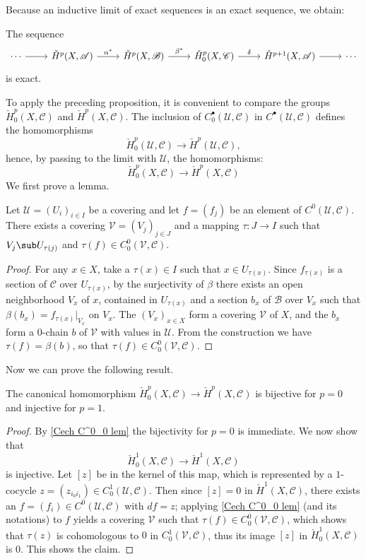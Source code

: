Because an inductive limit of exact sequences is an exact sequence, we obtain:
\begin{proposition}
The sequence
\[\begin{tikzcd}
\cdots\ar[r]&\check{H}^p(X,\mathscr{A})\ar[r,"\alpha^*"]&\check{H}^p(X,\mathscr{B})\ar[r,"\beta^*"]&\check{H}^p_0(X,\mathscr{C})\ar[r,"\delta"]&\check{H}^{p+1}(X,\mathscr{A})\ar[r]&\cdots
\end{tikzcd}\]
is exact.
\end{proposition}
To apply the preceding proposition, it is convenient to compare the groups
$\check{H}^p_0(X,\mathscr{C})$ and $\check{H}^p(X,\mathscr{C})$. The inclusion of $C_0^\bullet(\mathcal{U},\mathscr{C})$ in $C^\bullet(\mathcal{U},\mathscr{C})$ defines the homomorphisms
\[\check{H}_0^p(\mathcal{U},\mathscr{C})\to\check{H}^p(\mathcal{U},\mathscr{C}),\]
hence, by passing to the limit with $\mathcal{U}$, the homomorphisms:
\[\check{H}_0^p(X,\mathscr{C})\to\check{H}^p(X,\mathscr{C})\]
We first prove a lemma.
\begin{lemma}\label{Cech C^0_0 lem}
Let $\mathcal{U}=(U_i)_{i\in I}$ be a covering and let $f=(f_j)$ be an element of $C^0(\mathcal{U},\mathscr{C})$. There exists a covering $\mathcal{V}=(V_j)_{j\in J}$ and a mapping $\tau:J\to I$ such that $V_j\sub U_{\tau(j)}$ and $\tau(f)\in C^0_0(\mathcal{V},\mathscr{C})$.
\end{lemma}
\begin{proof}
For any $x\in X$, take a $\tau(x)\in I$ such that $x\in U_{\tau(x)}$. Since $f_{\tau(x)}$ is a section of $\mathscr{C}$ over $U_{\tau(x)}$, by the surjectivity of $\beta$ there exists an open neighborhood $V_x$ of $x$, contained in $U_{\tau(x)}$ and a section $b_x$ of $\mathscr{B}$ over $V_x$ such that $\beta(b_x)=f_{\tau(x)}|_{V_x}$ on $V_x$. The $(V_x)_{x\in X}$ form a covering $\mathcal{V}$ of $X$, and the $b_x$ form a $0$-chain $b$ of $\mathcal{V}$ with values in $\mathcal{U}$. From the construction we have $\tau(f)=\beta(b)$, so that $\tau(f)\in C^0_0(\mathcal{V},\mathscr{C})$.
\end{proof}
Now we can prove the following result.
\begin{theorem}\label{Cech cohomology equal to cohomology at 0 1} 
The canonical homomorphism $\check{H}^p_0(X,\mathscr{C})\to\check{H}^p(X,\mathscr{C})$ is bijective for $p=0$ and injective for $p=1$.
\end{theorem}
\begin{proof}
By \cref{Cech C^0_0 lem} the bijectivity for $p=0$ is immediate. We now show that
\[\check{H}^1_0(X,\mathscr{C})\to\check{H}^1(X,\mathscr{C})\]
is injective. Let $[z]$ be in the kernel of this map, which is represented by a $1$-cocycle $z=(z_{i_0i_1})\in C^1_0(\mathcal{U},\mathscr{C})$. Then since $[z]=0$ in $\check{H}^1(X,\mathscr{C})$, there exists an $f=(f_i)\in C^0(\mathcal{U},\mathscr{C})$ with $df=z$; applying \cref{Cech C^0_0 lem} (and its notations) to $f$ yields a covering $\mathcal{V}$ such that $\tau(f)\in C^0_0(\mathcal{V},\mathscr{C})$, which shows that $\tau(z)$ is cohomologous to $0$ in $C^1_0(\mathcal{V},\mathscr{C})$, thus its image $[z]$ in $\check{H}^1_0(X,\mathscr{C})$ is $0$. This shows the claim.
\end{proof}
